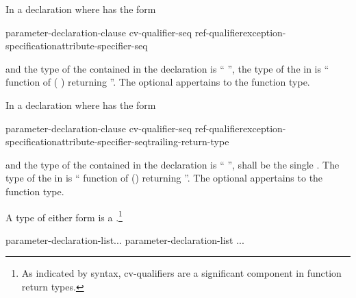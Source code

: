 \pnum
{}%
In a declaration
where
has the form

\begin{ncsimplebnf}
 parameter-declaration-clause \terminal{)} cv-qualifier-seq\opt\br
\hspace*{\bnfindentinc}ref-qualifier\opt exception-specification\opt attribute-specifier-seq\opt
\end{ncsimplebnf}

and the type of the contained
in the declaration
is
``
'',
the type of the
in
is `` function of
( )
  returning
''.
The optional  appertains to the function type.

\pnum
In a declaration
where
has the form

\begin{ncsimplebnf}
 parameter-declaration-clause \terminal{)} cv-qualifier-seq\opt\br
\hspace*{\bnfindentinc}ref-qualifier\opt exception-specification\opt attribute-specifier-seq\opt trailing-return-type
\end{ncsimplebnf}

and the type of the contained  in the declaration 
 is `` '',  shall
be the single  . The type of the
 in  is
`` function of
() \opt
{}\opt returning ''. The
optional  appertains to the function type.

\pnum
{}%
A type of either form is a .\footnote{As indicated by syntax, cv-qualifiers are a significant component in function return types.}

%
\begin{bnf}
\br
    parameter-declaration-list\opt ...\opt\br
    parameter-declaration-list \terminal{,} ...
\end{bnf}

